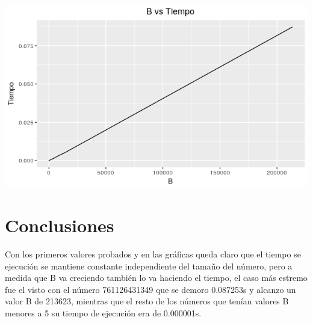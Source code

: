 \documentclass[12pt,letterpaper]{scrartcl}
\begin{document}
\begin{center}
\includegraphics[scale=1]{BvsTiempo.png} 
\end{center}
\newpage
\section{Conclusiones}
	
Con los primeros valores probados y en las gráficas queda claro que el tiempo se ejecución se mantiene constante independiente del tamaño del número, pero a medida que B va creciendo también lo va haciendo el tiempo, el caso más estremo fue el visto con el número 761126431349 que se demoro 0.087253s y alcanzo un valor B de 213623, mientras que el resto de los números que tenían valores B menores a 5 su tiempo de ejecución era de 0.000001s.
\end{document}
